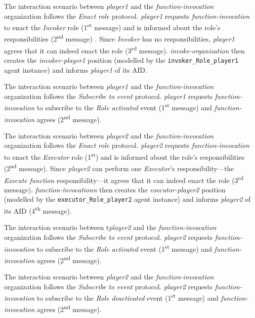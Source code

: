 The {} interaction scenario between \textit{player1} and the \textit{function-invocation} organization follows the \textit{Enact role} protocol.
\textit{player1} requests \textit{function-invocation} to enact the \textit{Invoker} role (1\textsuperscript{st} message) and is informed about the role's responsibilities (2\textsuperscript{nd} message) .
Since \textit{Invoker} has no responsibilities, \textit{player1} agrees that it can indeed enact the role (3\textsuperscript{rd} message).
\textit{invoke-organization} then creates the \textit{invoker-player1} position (modelled by the \texttt{invoker\_Role\_player1} agent instance) and informs \textit{player1} of its AID.

The {} interaction scenario between \textit{player1} and the \textit{function-invocation} organization follows the \textit{Subscribe to event} protocol.
\textit{player1} requests \textit{function-invocation} to subscribe to the \textit{Role activated} event (1\textsuperscript{st} message) and \textit{function-invocation} agrees (2\textsuperscript{nd} message).

The {} interaction scenario between \textit{player2} and the \textit{function-invocation} organization follows the \textit{Enact role} protocol.
\textit{player2} requests \textit{function-invocation} to enact the \textit{Executor} role (1\textsuperscript{st}) and is informed about the role's responsibilities (2\textsuperscript{nd} message).
Since \textit{player2} can perform one \textit{Executor}'s responsibility---the \textit{Execute function} responsibility---it agrees that it can indeed enact the role (3\textsuperscript{rd} message).
\textit{function-invocationn} then creates the \textit{executor-player2} position (modelled by the \texttt{executor\_Role\_player2} agent instance) and informs \textit{player2} of its AID (4\textsuperscript{th} message).

The {} interaction scenario between t\textit{player2} and the \textit{function-invocation} organization follows the \textit{Subscribe to event} protocol.
\textit{player2} requests \textit{function-invocation} to subscribe to the \textit{Role activated} event (1\textsuperscript{st} message) and \textit{function-invocation} agrees (2\textsuperscript{nd} message).

The {} interaction scenario between \textit{player2} and the \textit{function-invocation} organization follows the \textit{Subscribe to event} protocol.
\textit{player2} requests \textit{function-invocation} to subscribe to the \textit{Role deactivated} event (1\textsuperscript{st} message) and \textit{function-invocation} agrees (2\textsuperscript{nd} message).

